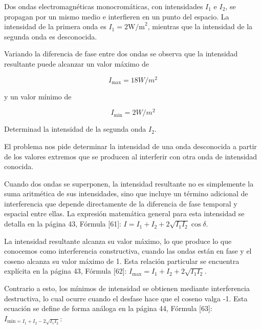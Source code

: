 \documentclass[11pt, a4paper]{article}
\newenvironment{problem}[1][Cuestión]{
	\vspace{0.5cm}
	\noindent{\Large\bfseries #1} \par\vspace{0.5cm}
}{
	\vspace{0.5cm}
}
\begin{document}
	\begin{problem}[Cuestión 4]
	Dos ondas electromagnéticas monocromáticas, con intensidades $I_1$ e $I_2$, se propagan por un mismo medio e interfieren en un punto del espacio. La intensidad de la primera onda es $I_1 = 2 \text{W/m}^2$, mientras que la intensidad de la segunda onda es desconocida.

	Variando la diferencia de fase entre dos ondas se observa que la intensidad resultante puede alcanzar un valor máximo de

	\begin{equation}
		I_{\text{max}} = 18 W/m^2
	\end{equation}

	\vspace{0.25cm}

	y un valor mínimo de

	\begin{equation}
		I_{\text{min}} = 2 W/m^2
	\end{equation}

	\vspace{0.25cm}

	Determinad la intensidad de la segunda onda $I_2$.

	\vspace{0.5cm}

	{ \color{blue} 
		El problema nos pide determinar la intensidad de una onda desconocida a partir de los valores extremos que se producen al interferir con otra onda de intensidad conocida.

		Cuando dos ondas se superponen, la intensidad resultante no es simplemente la suma aritmética de sus intensidades, sino que incluye un término adicional de interferencia que depende directamente de la diferencia de fase temporal y espacial entre ellas. La expresión matemática general para esta intensidad se detalla en la página 43, Fórmula [61]: $I = I_1 + I_2 + 2 \sqrt{I_1 I_2} \cos {\delta}$.

		La intensidad resultante alcanza su valor máximo, lo que produce lo que conocemos como interferencia constructiva, cuando las ondas están en fase y el coseno alcanza su valor máximo de 1. Esta relación particular se encuentra explícita en la página 43, Fórmula [62]: $I_{\text{max}} = I_1 + I_2 + 2 \sqrt{I_1 I_2}$.

		Contrario a esto, los mínimos de intensidad se obtienen mediante interferencia destructiva, lo cual ocurre cuando el desfase hace que el coseno valga -1. Esta ecuación se define de forma análoga en la página 44, Fórmula [63]: $I_{\text{min} = I_1 + I_2 - 2 \sqrt{I_1 I_2}}$:

}
\end{problem}
\end{document}
